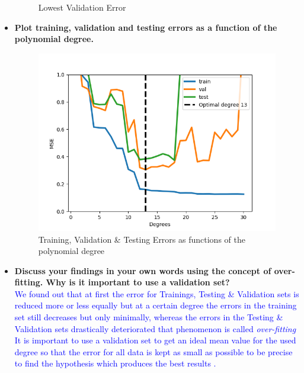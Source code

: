\documentclass[a4paper]{article}
\begin{document}
\begin{itemize}
\begin{figure}[ht]
 \captionsetup{justification=centering}
  \caption{Lowest Validation Error}
    \label{plot_poly_degree13_lowest_validation_error}
  \end{figure}
  
\newpage
\item \textbf{Plot training, validation and testing errors as a function of the polynomial degree.} \\
\begin{figure}[ht]
    \centering
 \includegraphics[scale=0.50]{plots/plot_poly_function_of_polynomial_degree.png}
 \captionsetup{justification=centering}
  \caption{Training, Validation \& Testing Errors as functions of the polynomial degree}
    \label{plot_poly_function_of_polynomial_degree}
  \end{figure}
\item \textbf{Discuss your findings in your own words using the concept of over-fitting. Why is it important to use a validation set?} \\
\textcolor{blue}{ We found out that at first the error for Trainings, Testing \& Validation sets is reduced more or less equally but at a certain degree the errors in the training set still decreases but only minimally,  whereas the errors in the Testing \& Validation sets drastically deteriorated that phenomenon is called \textit{over-fitting}
It is important to use a validation set to get an ideal mean value for the used degree so that the error for all data is kept as small as possible to be precise to find the hypothesis which produces the best results .
} 
\end{itemize}
\end{document}
